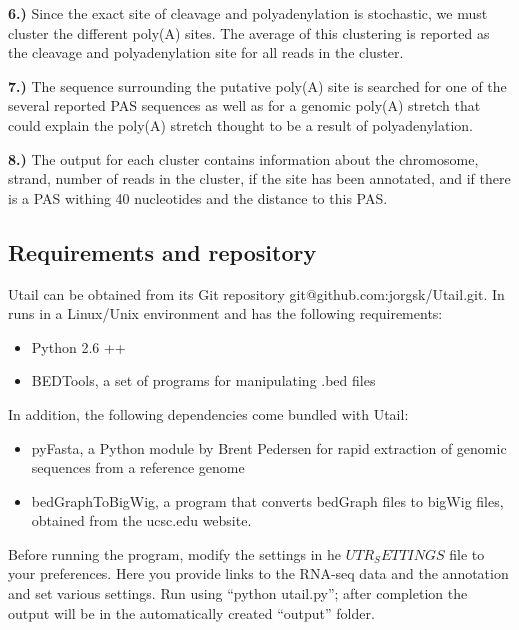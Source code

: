 \textbf{6.)} Since the exact site of cleavage and polyadenylation is stochastic,
we must cluster the different poly(A) sites. The average of this clustering is
reported as the cleavage and polyadenylation site for all reads in the cluster.

\textbf{7.)} The sequence surrounding the putative poly(A) site is searched for
one of the several reported PAS sequences as well as for a genomic poly(A)
stretch that could explain the poly(A) stretch thought to be a result of
polyadenylation.

\textbf{8.)} The output for each cluster contains information about the
chromosome, strand, number of reads in the cluster, if the site has been
annotated, and if there is a PAS withing 40 nucleotides and the distance to
this PAS.

\subsection{Requirements and repository}
Utail can be obtained from its Git repository git@github.com:jorgsk/Utail.git.
In runs in a Linux/Unix environment and has the following requirements:
\begin{itemize}
	\item Python 2.6 ++
	\item BEDTools, a set of programs for manipulating .bed files
		\cite{quinlan_bedtools:_2010}
\end{itemize}
In addition, the following dependencies come bundled with Utail:
\begin{itemize}
	\item pyFasta, a Python module by Brent Pedersen for rapid extraction of
		genomic sequences from a reference genome
	\item bedGraphToBigWig, a program that converts bedGraph files to bigWig
		files, obtained from the ucsc.edu website.
\end{itemize}
Before running the program, modify the settings in he $UTR_SETTINGS$ file to your
preferences. Here you provide links to the RNA-seq data and the annotation and
set various settings. Run using ``python utail.py''; after completion the
output will be in the automatically created ``output'' folder.
